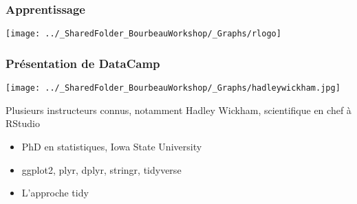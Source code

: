 \documentclass{beamer}
\begin{document}

    \begin{frame}
    
      \frametitle{Apprentissage} \vspace{1cm}
      
          \begin{center}

        \texttt{[image: ../\_SharedFolder\_BourbeauWorkshop/\_Graphs/rlogo]}
          \end{center}

    \end{frame}


    \begin{frame}
    
      \frametitle{Présentation de DataCamp} \vspace{1cm}
      
        \begin{center}
        
         \texttt{[image: ../\_SharedFolder\_BourbeauWorkshop/\_Graphs/hadleywickham.jpg]}
         
        \end{center} 
      
      Plusieurs instructeurs connus, notamment Hadley Wickham, scientifique en chef à RStudio
      
          \begin{itemize}
            \item{PhD en statistiques, Iowa State University}
            \item{ggplot2, plyr, dplyr, stringr, tidyverse}
            \item{L'approche tidy}
          \end{itemize}
    
    \end{frame}
    
\end{document}
